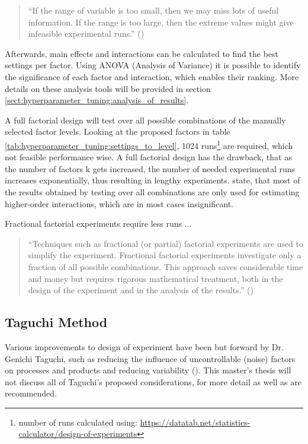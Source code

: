 \begin{quote}
	\begin{em}
		\enquote{If the range of variable is too small, then we may miss lots of useful information. If the range is too large, then the extreme values might give infeasible experimental runs.} (\cite{yang_design_2009})
	\end{em}
\end{quote}

Afterwards, main effects and interactions can be calculated to find the best settings per factor. Using ANOVA (Analysis of Variance) it is possible to identify the significance of each factor and interaction, which enables their ranking. More details on these analysis tools will be provided in section \ref{sect:hyperparameter_tuning:analysis_of_results}.

A full factorial design will test over all possible combinations of the manually selected factor levels. Looking at the proposed factors in table \ref{tab:hyperparameter_tuning:settings_to_level}, 1024 runs\footnote{number of runs calculated using: \url{https://datatab.net/statistics-calculator/design-of-experiments}} are required, which not feasible performance wise. A full factorial design has the drawback, that as the number of factors k gets increased, the number of needed experimental runs increases exponentially, thus resulting in lengthy experiments. \cite{yang_design_2009} state, that most of the results obtained by testing over all combinations are only used for estimating higher-order interactions, which are in most cases insignificant.

Fractional factorial experiments require less runs ... 

\begin{quote}
	\begin{em}
		\enquote{Techniques such as fractional (or partial) factorial experiments are used to simplify the experiment. Fractional factorial experiments investigate only a fraction of all possible combinations. This approach saves considerable time and money but requires rigorous mathematical treatment, both in the design of the experiment and in the analysis of the results.} (\cite{roy_primer_1990})
	\end{em}
\end{quote}


\subsection{Taguchi Method}
Various improvements to design of experiment have been but forward by Dr. Genichi Taguchi, such as reducing the influence of uncontrollable (noise) factors on processes and products and reducing variability (\cite{roy_primer_1990}). This master's thesis will not discuss all of Taguchi's proposed considerations, for more detail \cite{roy_primer_1990} as well as \cite{yang_design_2009} are recommended.

